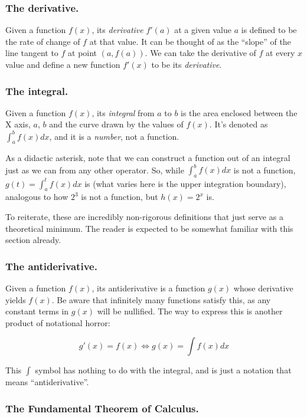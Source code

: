 \subsubsection{The derivative.}

Given a function $f(x)$, its \textit{derivative} $f'(a)$ at a given value $a$ is defined to be the rate of change of $f$ at that value. It can be thought of as the \enquote{slope} of the line tangent to $f$ at point $(a, f(a))$. We can take the derivative of $f$ at every $x$ value and define a new function $f'(x)$ to be its \textit{derivative}.

\subsubsection{The integral.}

Given a function $f(x)$, its \textit{integral} from $a$ to $b$ is the area enclosed between the X axis, $a$, $b$ and the curve drawn by the values of $f(x)$. It's denoted as $\int_{a}^{b} f(x) dx$, and it is a \textit{number}, not a function.

As a didactic asterisk, note that we can construct a function out of an integral just as we can from any other operator. So, while $\int_a^b f(x) dx$ is not a function, $g(t) = \int_a^t f(x) dx$ is (what varies here is the upper integration boundary), analogous to how $2^3$ is not a function, but $h(x) = 2^x$ is.

To reiterate, these are incredibly non-rigorous definitions that just serve as a theoretical minimum. The reader is expected to be somewhat familiar with this section already.

\subsubsection{The antiderivative.}

Given a function $f(x)$, its antiderivative is a function $g(x)$ whose derivative yields $f(x)$. Be aware that infinitely many functions satisfy this, as any constant terms in $g(x)$ will be nullified. The way to express this is another product of notational horror:

$$g'(x) = f(x) \iff g(x) = \int f(x) dx$$

This $\int$ symbol has nothing to do with the integral, and is just a notation that means \enquote{antiderivative}.

\subsubsection{The Fundamental Theorem of Calculus.}

